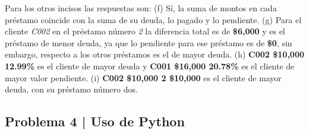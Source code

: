 \documentclass{article}
\begin{document}
\noindent
Para los otros incisos las respuestas son: (f) Sí, la suma de montos en cada préstamo coincide con la suma de su deuda, lo pagado y lo pendiente. (g) Para el cliente \textit{C002} en el préstamo número \textit{2} la diferencia total es de \textbf{\$6,000} y es el préstamo de menor deuda, ya que lo pendiente para ese préstamo es de \textbf{\$0}, sin embargo, respecto a los otros préstamos es el de mayor deuda. (h) \textbf{C002 \$10,000 12.99\%} es el cliente de mayor deuda y \textbf{C001 \$16,000 20.78\%} es el cliente de mayor valor pendiente. (i) \textbf{C002 \$10,000 2 \$10,000} es el cliente de mayor deuda, con su préstamo número dos.

\clearpage

\subsection*{Problema 4 | Uso de Python}
\end{document}
